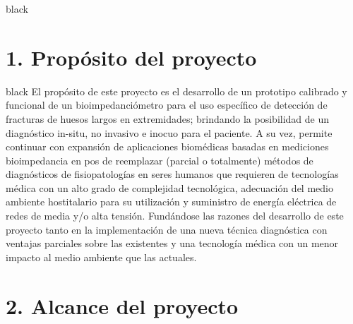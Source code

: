 \documentclass[11pt]{charter}
\begin{document}
\begin{consigna}{black}
\begin{itemize}
\end{itemize}

\end{consigna}

\pagebreak

\section{1. Propósito del proyecto}
\label{sec:proposito}

\begin{consigna}{black}
El propósito de este proyecto es el desarrollo de un prototipo calibrado y funcional de un bioimpedanciómetro para el uso específico de detección de fracturas de huesos largos en extremidades; brindando la posibilidad de un diagnóstico in-situ, no invasivo e inocuo para el paciente.
A su vez, permite continuar con expansión de aplicaciones biomédicas basadas en mediciones bioimpedancia en pos de reemplazar (parcial o totalmente) métodos de diagnósticos de fisiopatologías en seres humanos que requieren de tecnologías médica con un alto grado de complejidad tecnológica, adecuación del medio ambiente hostitalario para su utilización y suministro de energía eléctrica de redes de media y/o alta tensión.
Fundándose las razones del desarrollo de este proyecto tanto en la implementación de una nueva técnica diagnóstica con ventajas parciales sobre las existentes y una tecnología médica con un menor impacto al medio ambiente que las actuales.

\end{consigna}

\pagebreak

\section{2. Alcance del proyecto}
\label{sec:alcance}
\end{document}
